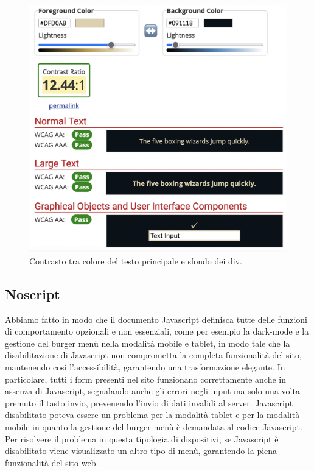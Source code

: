 \documentclass[a4paper]{article}
\begin{document}
	\begin{figure}[H]
		\centering
		\includegraphics[scale=0.3]{immagini/controllo-colori/dark-mode/testo-principale_sfondo-div.png}
		\caption{Contrasto tra colore del testo principale e sfondo dei div.}
	\end{figure}

	\subsection{Noscript}
	Abbiamo fatto in modo che il documento Javascript definisca tutte delle funzioni di comportamento opzionali e non essenziali, come per esempio la dark-mode e la gestione del burger menù nella modalità mobile e tablet, in modo tale che la disabilitazione di Javascript non comprometta la completa funzionalità del sito, mantenendo così l'accessibilità, garantendo una trasformazione elegante. In particolare, tutti i form presenti nel sito funzionano correttamente anche in assenza di Javascript, segnalando anche gli errori negli input ma solo una volta premuto il tasto invio, prevenendo l'invio di dati invalidi al server. Javascript disabilitato poteva essere un problema per la modalità tablet e per la modalità mobile in quanto la gestione del burger menù è demandata al codice Javascript. Per risolvere il problema in questa tipologia di dispositivi, se Javascript è disabilitato viene visualizzato un altro tipo di menù, garantendo la piena funzionalità del sito web.
	
\end{document}
